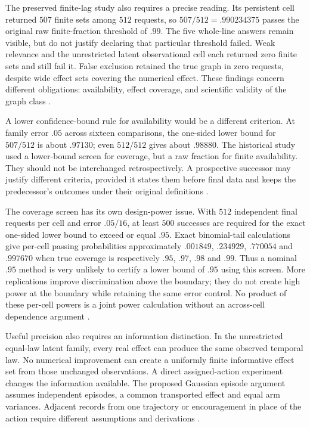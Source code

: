 The preserved finite-lag study also requires a precise reading. Its
persistent cell returned $507$ finite sets among $512$ requests, so
$507/512=.990234375$ passes the original raw finite-fraction threshold
of $.99$. The five whole-line answers remain visible, but do not justify
declaring that particular threshold failed. Weak relevance and the
unrestricted latent observational cell each returned zero finite sets
and still fail it. False exclusion retained the true graph in zero
requests, despite wide effect sets covering the numerical effect.
These findings concern different obligations: availability, effect
coverage, and scientific validity of the graph class
\citep{exec13_temporal_design}.

A lower confidence-bound rule for availability would be a different
criterion. At family error $.05$ across sixteen comparisons, the
one-sided lower bound for $507/512$ is about $.97130$; even $512/512$
gives about $.98880$. The historical study used a lower-bound screen
for coverage, but a raw fraction for finite availability. They should
not be interchanged retrospectively. A prospective successor may
justify different criteria, provided it states them before final data
and keeps the predecessor's outcomes under their original definitions
\citep{exec13_temporal_design}.

The coverage screen has its own design-power issue. With $512$
independent final requests per cell and error $.05/16$, at least $500$
successes are required for the exact one-sided lower bound to exceed
or equal $.95$. Exact binomial-tail calculations give per-cell passing
probabilities approximately $.001849$, $.234929$, $.770054$ and
$.997670$ when true coverage is respectively $.95$, $.97$, $.98$ and
$.99$. Thus a nominal $.95$ method is very unlikely to certify a
lower bound of $.95$ using this screen. More replications improve
discrimination above the boundary; they do not create high power at
the boundary while retaining the same error control. No product of
these per-cell powers is a joint power calculation without an
across-cell dependence argument \citep{exec13_temporal_design}.

Useful precision also requires an information distinction. In the
unrestricted equal-law latent family, every real effect can produce
the same observed temporal law. No numerical improvement can create
a uniformly finite informative effect set from those unchanged
observations. A direct assigned-action experiment changes the
information available. The proposed Gaussian episode argument assumes
independent episodes, a common transported effect and equal arm
variances. Adjacent records from one trajectory or encouragement in
place of the action require different assumptions and derivations
\citep{exec13_temporal_design}.

